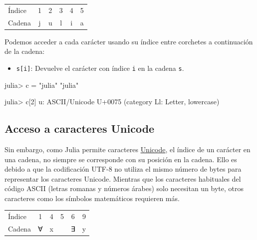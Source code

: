 \documentclass[
  letterpaper,
  DIV=11,
  numbers=noendperiod]{scrreprt}
\newenvironment{Shaded}{\begin{snugshade}}{\end{snugshade}}
\newcommand{\BuiltInTok}[1]{\textcolor[rgb]{0.00,0.23,0.31}{#1}}
\newcommand{\CharTok}[1]{\textcolor[rgb]{0.13,0.47,0.30}{#1}}
\newcommand{\FloatTok}[1]{\textcolor[rgb]{0.68,0.00,0.00}{#1}}
\newcommand{\NormalTok}[1]{\textcolor[rgb]{0.00,0.23,0.31}{#1}}
\newcommand{\OperatorTok}[1]{\textcolor[rgb]{0.37,0.37,0.37}{#1}}
\newcommand{\StringTok}[1]{\textcolor[rgb]{0.13,0.47,0.30}{#1}}
\providecommand{\tightlist}{%
  \setlength{\itemsep}{0pt}\setlength{\parskip}{0pt}}\usepackage{longtable,booktabs,array}
\begin{document}
\begin{longtable}[]{@{}lccccc@{}}
\toprule()
\endhead
Índice & 1 & 2 & 3 & 4 & 5 \\
Cadena & j & u & l & i & a \\
\bottomrule()
\end{longtable}

Podemos acceder a cada carácter usando su índice entre corchetes a
continuación de la cadena:

\begin{itemize}
\tightlist
\item
  \texttt{s{[}i{]}}: Devuelve el carácter con índice \texttt{i} en la
  cadena \texttt{s}.
\end{itemize}

\begin{Shaded}
\begin{Highlighting}[]
\NormalTok{julia}\OperatorTok{\textgreater{}}\NormalTok{ c }\OperatorTok{=} \StringTok{"julia"}
\StringTok{"julia"}

\NormalTok{julia}\OperatorTok{\textgreater{}}\NormalTok{ c[}\FloatTok{2}\NormalTok{]}
\CharTok{\textquotesingle{}u\textquotesingle{}}\OperatorTok{:}\NormalTok{ ASCII}\OperatorTok{/}\BuiltInTok{Unicode}\NormalTok{ U}\OperatorTok{+}\FloatTok{0075}\NormalTok{ (category Ll}\OperatorTok{:}\NormalTok{ Letter, lowercase)}
\end{Highlighting}
\end{Shaded}

\hypertarget{acceso-a-caracteres-unicode}{%
\subsection{Acceso a caracteres
Unicode}\label{acceso-a-caracteres-unicode}}

Sin embargo, como Julia permite caracteres
\href{https://en.wikipedia.org/wiki/List_of_Unicode_characters}{Unicode},
el índice de un carácter en una cadena, no siempre se corresponde con su
posición en la cadena. Ello es debido a que la codificación UTF-8 no
utiliza el mismo número de bytes para representar los caracteres
Unicode. Mientras que los caracteres habituales del código ASCII (letras
romanas y números árabes) solo necesitan un byte, otros caracteres como
los símbolos matemáticos requieren más.

\begin{longtable}[]{@{}lccccc@{}}
\toprule()
\endhead
Índice & 1 & 4 & 5 & 6 & 9 \\
Cadena & ∀ & x & & ∃ & y \\
\bottomrule()
\end{longtable}
\end{document}
